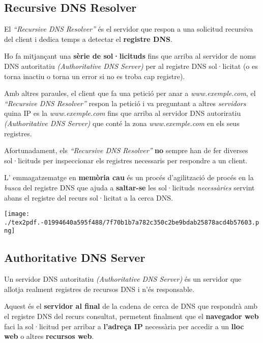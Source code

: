 \documentclass[]{article}
\begin{document}
\hypertarget{recursive-dns-resolver}{%
\subsection{\texorpdfstring{\textbf{Recursive DNS
Resolver}}{Recursive DNS Resolver}}\label{recursive-dns-resolver}}

El \emph{``Recursive DNS Resolver''} és el servidor que respon a una
solicitud recursiva del client i dedica temps a detectar el
\textbf{registre DNS}.

Ho fa mitjançant una \textbf{sèrie de sol·licituds} fins que arriba al
servidor de noms DNS autoritatiu \emph{(Authoritative DNS Server)} per
al registre DNS sol·licitat (o es torna inactiu o torna un error si no
es troba cap registre).

Amb altres paraules, el client que fa una petició per anar a
\emph{www.exemple.com}, el \emph{``Recursive DNS Resolver''} respon la
petició i va preguntant a altres \emph{servidors} quina IP es la
\emph{www.exemple.com} fins que arriba al servidor DNS autoriratiu
\emph{(Authoritative DNS Server)} que conté la zona
\emph{www.exemple.com} en els seus registres.

Afortunadament, els \emph{``Recursive DNS Resolver''} \textbf{no} sempre
han de fer diverses sol·licituds per inspeccionar els registres
necessaris per respondre a un client.

L' emmagatzematge en \textbf{memòria cau} és un procés d'agilització de
procés en la \emph{busca} del registre DNS que ajuda a
\textbf{saltar-se} les sol·licituds \emph{necessàries} servint abans el
registre del recurs sol·licitat a la cerca DNS.

\texttt{[image: ./tex2pdf.-01994640a595f488/7f70b1b7a782c350c2be9bdab25878acd4b57603.png]}

\hypertarget{authoritative-dns-server}{%
\subsection{\texorpdfstring{\textbf{Authoritative DNS
Server}}{Authoritative DNS Server}}\label{authoritative-dns-server}}

Un servidor DNS autoritatiu \emph{(Authoritative DNS Server)} és un
servidor que allotja realment registres de recursos DNS i n'és
responsable.

Aquest és el \textbf{servidor al final} de la cadena de cerca de DNS que
respondrà amb el registre DNS del recurs consultat, permetent finalment
que el \textbf{navegador web} faci la sol·licitud per arribar a
\textbf{l'adreça IP} necessària per accedir a un \textbf{lloc web} o
altres \textbf{recursos web}.
\end{document}
